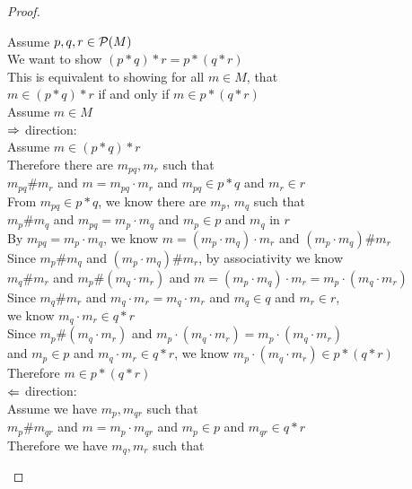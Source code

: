 \begin{proof}
\begin{enumerate}
  \begin{tabbedproof}
    \oo Assume $p, q, r \in \mathcal{P}(M)$ \\
    \oo We want to show $(p * q) * r = p * (q * r)$ \\
    \oo This is equivalent to showing for all $m \in M$, that \\
    \ox $m \in (p * q) * r$ if and only if $ m \in p * (q * r)$ \\
    \oo Assume $m \in M$ \\
    \ooo $\Rightarrow$ direction: \\
    \oooo Assume $m \in (p * q) * r$ \\
    \ooooo Therefore there are $m_{pq}, m_r$ such that \\
    \ooooox $m_{pq} \# m_r$ and $m = m_{pq} \cdot m_r$ and $m_{pq} \in p * q$ and $m_r \in r$ \\
    \ooooo From $m_{pq} \in p * q$, we know there are $m_p$, $m_q$ such that \\
    \ooooox $m_p \# m_q$ and $m_{pq} = m_p \cdot m_q$ and $m_p \in p$ and $m_q$ in $r$ \\
    \ooooo By $m_{pq} = m_p \cdot m_q$, we know $m = (m_p \cdot m_q) \cdot m_r$ and $(m_p \cdot m_q) \# m_r$\\
    \ooooo Since $m_p \# m_q$ and $(m_p \cdot m_q) \# m_r$, by associativity we know \\
    \ooooox $m_q \# m_r$ and $m_p \# (m_q \cdot m_r)$ and 
            $m = (m_p \cdot m_q) \cdot m_r = m_p \cdot (m_q \cdot m_r)$ \\
    \ooooo Since $m_q \# m_r$ and $m_q \cdot m_r = m_q \cdot m_r$ and $m_q \in q$ and $m_r \in r$, \\
    \ooooox we know $m_q \cdot m_r \in q * r$ \\
    \ooooo Since $m_p \# (m_q \cdot m_r)$ and $m_p \cdot (m_q \cdot m_r) = m_p \cdot (m_q \cdot m_r)$ \\
    \ooooox and $m_p \in p$ and $m_q \cdot m_r \in q * r$,  we know $m_p \cdot (m_q \cdot m_r) \in p * (q * r)$ \\
    \ooooo Therefore $m \in p * (q * r)$ \\
    \ooo $\Leftarrow$ direction: \\
    \oooo Assume we have $m_p, m_{qr}$ such that \\
    \oooox $m_p \# m_{qr}$ and $m = m_p \cdot m_{qr}$ and $m_p \in p$ and $m_{qr} \in q * r$ \\
    \ooooo Therefore we have $m_q, m_r$ such that \\

\end{tabbedproof}
\end{enumerate}
\end{proof}
